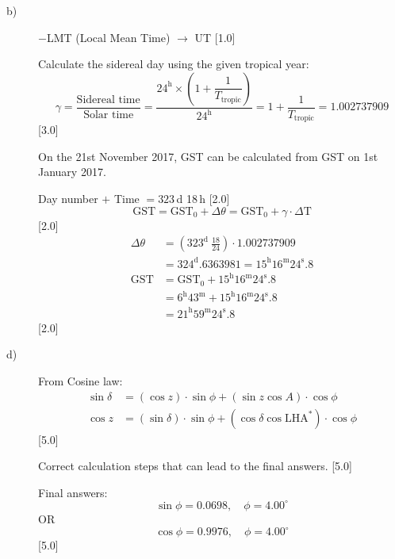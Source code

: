 \begin{description}
\item[b)] $-$LMT (Local Mean Time) $\rightarrow$ UT \hfill[1.0]

  Calculate the sidereal day using the given tropical year:
  \[ \gamma = \frac{\text{Sidereal time}}{\text{Solar time}}
     = \frac{24^{\mathrm{h}}\times\left(1
       + \dfrac{1}{T_{\mathrm{tropic}}}\right)}{24^{\mathrm{h}}}
     = 1 + \frac{1}{T_{\mathrm{tropic}}} = 1.002737909 \]
  \hfill[3.0]

  On the 21st November 2017, GST can be calculated from GST on 1st January
  2017.

  Day number $+$ Time $= 323$\,d 18\,h \hfill[2.0]
  \[ \mathrm{GST} = \mathrm{GST}_0 + \Delta\theta
     = \mathrm{GST}_0 + \gamma\cdot\Delta\mathrm{T} \]
  \hfill[2.0]
  \begin{align*}
  \Delta\theta &= \left(323^{\mathrm{d}}\ \tfrac{18}{24}\right)
    \cdot 1.002737909\\
  &= 324^{\mathrm{d}}.6363981
   = 15^{\mathrm{h}}16^{\mathrm{m}}24^{\mathrm{s}}.8\\
  \mathrm{GST} &= \mathrm{GST}_0
    + 15^{\mathrm{h}}16^{\mathrm{m}}24^{\mathrm{s}}.8\\
  &= 6^{\mathrm{h}}43^{\mathrm{m}}
   + 15^{\mathrm{h}}16^{\mathrm{m}}24^{\mathrm{s}}.8\\
  &= 21^{\mathrm{h}}59^{\mathrm{m}}24^{\mathrm{s}}.8
  \end{align*}
  \hfill[2.0]

\item[d)] From Cosine law:
  \begin{align*}
  \sin\delta &= (\cos z)\cdot\sin\phi + (\sin z\cos A)\cdot\cos\phi\\
  \cos z &= (\sin\delta)\cdot\sin\phi
    + (\cos\delta\cos\mathrm{LHA}^{*})\cdot\cos\phi
  \end{align*}
  \hfill[5.0]

  Correct calculation steps that can lead to the final answers. \hfill[5.0]

  Final answers:
  \[ \sin\phi = 0.0698,\quad \phi = 4.00^\circ \]
  OR
  \[ \cos\phi = 0.9976,\quad \phi = 4.00^\circ \]
  \hfill[5.0]
\end{description}
